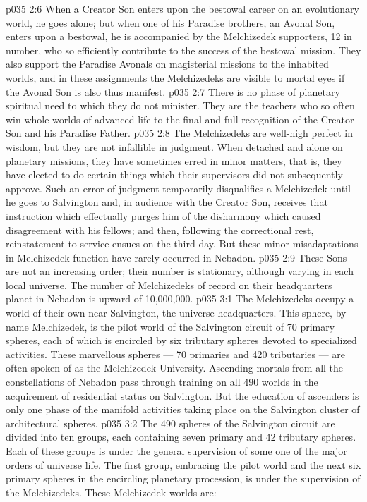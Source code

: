 \vs p035 2:6 When a Creator Son enters upon the bestowal career on an evolutionary world, he goes alone; but when one of his Paradise brothers, an Avonal Son, enters upon a bestowal, he is accompanied by the Melchizedek supporters, 12 in number, who so efficiently contribute to the success of the bestowal mission. They also support the Paradise Avonals on magisterial missions to the inhabited worlds, and in these assignments the Melchizedeks are visible to mortal eyes if the Avonal Son is also thus manifest.
\vs p035 2:7 There is no phase of planetary spiritual need to which they do not minister. They are the teachers who so often win whole worlds of advanced life to the final and full recognition of the Creator Son and his Paradise Father.
\vs p035 2:8 \pc The Melchizedeks are well\hyp{}nigh perfect in wisdom, but they are not infallible in judgment. When detached and alone on planetary missions, they have sometimes erred in minor matters, that is, they have elected to do certain things which their supervisors did not subsequently approve. Such an error of judgment temporarily disqualifies a Melchizedek until he goes to Salvington and, in audience with the Creator Son, receives that instruction which effectually purges him of the disharmony which caused disagreement with his fellows; and then, following the correctional rest, reinstatement to service ensues on the third day. But these minor misadaptations in Melchizedek function have rarely occurred in Nebadon.
\vs p035 2:9 These Sons are not an increasing order; their number is stationary, although varying in each local universe. The number of Melchizedeks of record on their headquarters planet in Nebadon is upward of 10,000,000.
\vs p035 3:1 The Melchizedeks occupy a world of their own near Salvington, the universe headquarters. This sphere, by name Melchizedek, is the pilot world of the Salvington circuit of 70 primary spheres, each of which is encircled by six tributary spheres devoted to specialized activities. These marvellous spheres --- 70 primaries and 420 tributaries --- are often spoken of as the Melchizedek University. Ascending mortals from all the constellations of Nebadon pass through training on all 490 worlds in the acquirement of residential status on Salvington. But the education of ascenders is only one phase of the manifold activities taking place on the Salvington cluster of architectural spheres.
\vs p035 3:2 The 490 spheres of the Salvington circuit are divided into ten groups, each containing seven primary and 42 tributary spheres. Each of these groups is under the general supervision of some one of the major orders of universe life. The first group, embracing the pilot world and the next six primary spheres in the encircling planetary procession, is under the supervision of the Melchizedeks. These Melchizedek worlds are:
